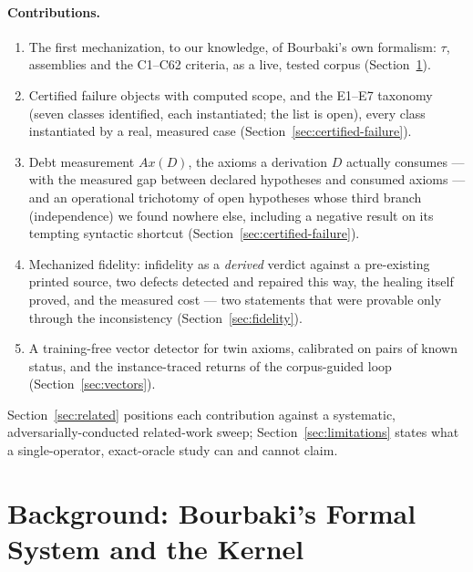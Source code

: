 \documentclass[11pt]{article}
\theoremstyle{remark}\newtheorem{example}{Example}
\begin{document}
\paragraph{Contributions.}
\begin{enumerate}
  \item The first mechanization, to our knowledge, of Bourbaki's own formalism:
        $\tau$, assemblies and the C1--C62 criteria, as a live, tested corpus
        (Section~\ref{sec:background}).
  \item Certified failure objects with computed scope, and the E1--E7 taxonomy
        (seven classes identified, each instantiated; the list is open),
        every class instantiated by a real, measured case
        (Section~\ref{sec:certified-failure}).
  \item Debt measurement $Ax(D)$, the axioms a derivation $D$ actually
        consumes --- with the measured gap between declared
        hypotheses and consumed axioms --- and an operational trichotomy of open
        hypotheses whose third branch (independence) we found nowhere else,
        including a negative result on its tempting syntactic shortcut
        (Section~\ref{sec:certified-failure}).
  \item Mechanized fidelity: infidelity as a \emph{derived} verdict against a
        pre-existing printed source, two defects detected and repaired this way, the
        healing itself proved, and the measured cost --- two statements that were
        provable only through the inconsistency (Section~\ref{sec:fidelity}).
  \item A training-free vector detector for twin axioms, calibrated on pairs of
        known status, and the instance-traced returns of the corpus-guided loop
        (Section~\ref{sec:vectors}).
\end{enumerate}

Section~\ref{sec:related} positions each contribution against a systematic,
adversarially-conducted related-work sweep; Section~\ref{sec:limitations} states
what a single-operator, exact-oracle study can and cannot claim.

\section{Background: Bourbaki's Formal System and the Kernel}
\label{sec:background}
\end{document}
